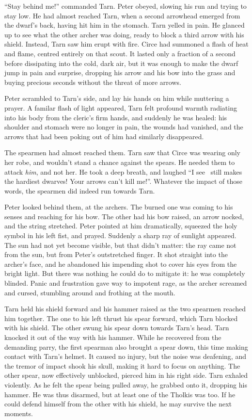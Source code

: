 ``Stay behind me!'' commanded Tarn.  Peter obeyed, slowing his run and trying to stay low.  He had almost reached Tarn, when a second arrowhead emerged from the dwarf's back, having hit him in the stomach.  Tarn yelled in pain.  He glanced up to see what the other archer was doing, ready to block a third arrow with his shield.  Instead, Tarn saw him erupt with fire.  Circe had summoned a flash of heat and flame, centred entirely on that scout.  It lasted only a fraction of a second before dissipating into the cold, dark air, but it was enough to make the dwarf jump in pain and surprise, dropping his arrow and his bow into the grass and buying precious seconds without the threat of more arrows.

Peter scrambled to Tarn's side, and lay his hands on him while muttering a prayer.  A familar flash of light appeared, Tarn felt profound warmth radiating into his body from the cleric's firm hands, and suddenly he was healed: his shoulder and stomach were no longer in pain, the wounds had vanished, and the arrows that had been poking out of him had similarly disappeared.

The spearmen had almost reached them.  Tarn saw that Circe was wearing only her robe, and wouldn't stand a chance against the spears.  He needed them to attack \emph{him}, and not her.  He took a deep breath, and laughed ``I see \korbarthrond\ still makes the hardiest dwarves!  Your arrows can't kill me!''.  Whatever the impact of those words, the spearmen did indeed run towards Tarn.

Peter looked behind them, at the archers.  The burned one was coming to his senses and reaching for his bow.  The other had his bow raised, an arrow nocked, and the string stretched.  Peter pointed at him dramatically, squeezed the holy symbol in his left fist, and prayed.  Suddenly a sharp ray of sunlight appeared.  The sun had not yet become visible, but that didn't matter: the ray came not from the sun, but from Peter's outstretched finger.  It shot straight into the archer's face, and he abandoned his impending shot to cover his eyes from the bright light.  But there was nothing he could do to mitigate it: he was completely blinded.  Panic and frustration gave way to impotent rage, as the archer screamed and cursed, stumbling around and frothing at the mouth.

Tarn held his shield forward and his hammer raised as the two spearmen reached him together.  The one to his left thrust his spear forward, which Tarn blocked with his shield.  The other swung his spear down towards Tarn's head.  Tarn knocked it out of the way with his hammer.  While he recovered from the demanding parry, the first spearman also brought a spear down, this time making contact with Tarn's helmet.  It caused no injury, but the noise was deafening, and the tremor of impact shook his skull, making it hard to focus on anything.  The other spear, now effectively unblocked, pierced him in his right side.  Tarn exhaled violently.  As he felt the spear being pulled away, he grabbed onto it, dropping his hammer.  He was thus disarmed, but at least one of the Tholkis was too.  If he could defend himself from the other with his shield, he may survive the next moments.


